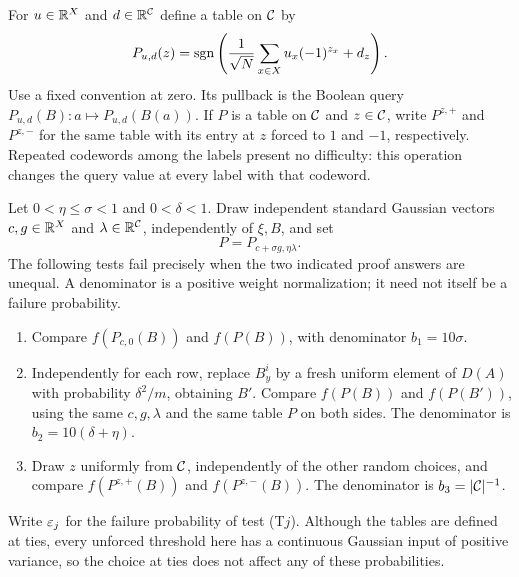 For $u\in\mathbb R^X$ and $d\in\mathbb R^{\mathcal C}$ define a table on $\mathcal C$ by
\begin{equation}\label{eq:inner-query}
 P_{u,d}(z)=\operatorname{sgn}\left(\frac1{\sqrt N}
                  \sum_{x\in X}u_x(-1)^{z_x}+d_z\right).
\end{equation}
Use a fixed convention at zero. Its pullback is the Boolean query
$P_{u,d}(B):a\mapsto P_{u,d}(B(a))$. If $P$ is a table on $\mathcal C$ and
$z\in\mathcal C$, write $P^{z,+}$ and $P^{z,-}$ for the same table with its entry
at $z$ forced to $1$ and $-1$, respectively. Repeated codewords among the
labels present no difficulty: this operation changes the query value at
every label with that codeword.

Let $0<\eta\le\sigma<1$ and $0<\delta<1$. Draw independent standard
Gaussian vectors $c,g\in\mathbb R^X$ and $\lambda\in\mathbb R^{\mathcal C}$, independently of
$\xi,B$, and set
\[
 P=P_{c+\sigma g,\eta\lambda}.
\]
The following tests fail precisely when the two indicated proof answers
are unequal. A denominator is a positive weight normalization; it need
not itself be a failure probability.
\begin{enumerate}[label=\textup{(T\arabic*)},leftmargin=*]
\item Compare $f(P_{c,0}(B))$ and $f(P(B))$, with denominator
      $b_1=10\sigma$.
\item Independently for each row, replace $B^i_y$ by a fresh uniform
      element of $D(A)$ with probability $\delta^2/m$, obtaining $B'$.
      Compare $f(P(B))$ and $f(P(B'))$, using the same $c,g,\lambda$ and
      the same table $P$ on both sides. The denominator is
      $b_2=10(\delta+\eta)$.
\item Draw $z$ uniformly from $\mathcal C$, independently of the other random
      choices, and compare $f(P^{z,+}(B))$ and $f(P^{z,-}(B))$.
      The denominator is $b_3=|\mathcal C|^{-1}$.
\end{enumerate}
Write $\varepsilon_j$ for the failure probability of test \textup{(T$j$)}.
Although the tables are defined at ties, every unforced threshold here
has a continuous Gaussian input of positive variance, so the choice at
ties does not affect any of these probabilities.

